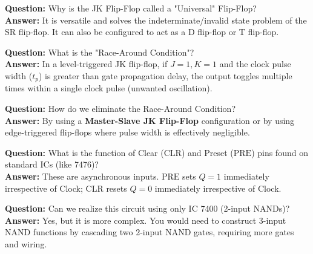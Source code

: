 \begin{vivaqa}
\textbf{Question:} Why is the JK Flip-Flop called a "Universal" Flip-Flop?\\[4pt]
\textbf{Answer:} It is versatile and solves the indeterminate/invalid state problem of the SR flip-flop. It can also be configured to act as a D flip-flop or T flip-flop.
\end{vivaqa}

\begin{vivaqa}
\textbf{Question:} What is the "Race-Around Condition"?\\[4pt]
\textbf{Answer:} In a level-triggered JK flip-flop, if $J=1, K=1$ and the clock pulse width ($t_p$) is greater than gate propagation delay, the output toggles multiple times within a single clock pulse (unwanted oscillation).
\end{vivaqa}

\begin{vivaqa}
\textbf{Question:} How do we eliminate the Race-Around Condition?\\[4pt]
\textbf{Answer:} By using a \textbf{Master-Slave JK Flip-Flop} configuration or by using edge-triggered flip-flops where pulse width is effectively negligible.
\end{vivaqa}

\begin{vivaqa}
\textbf{Question:} What is the function of Clear ($\text{CLR}$) and Preset ($\text{PRE}$) pins found on standard ICs (like 7476)?\\[4pt]
\textbf{Answer:} These are asynchronous inputs. $\text{PRE}$ sets $Q=1$ immediately irrespective of Clock; $\text{CLR}$ resets $Q=0$ immediately irrespective of Clock.
\end{vivaqa}

\begin{vivaqa}
\textbf{Question:} Can we realize this circuit using only IC 7400 (2-input NANDs)?\\[4pt]
\textbf{Answer:} Yes, but it is more complex. You would need to construct 3-input NAND functions by cascading two 2-input NAND gates, requiring more gates and wiring.
\end{vivaqa}
